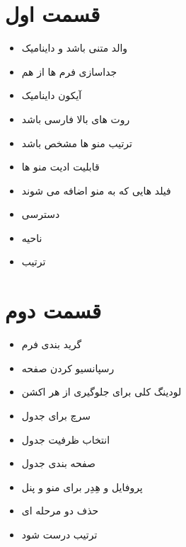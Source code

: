 \documentclass[12pt]{article}
\begin{document}


\section{قسمت اول}


\begin{itemize}
	\item والد متنی باشد و داینامیک
	\item جداسازی فرم ها از هم
	\item آیکون داینامیک
	\item روت های بالا فارسی باشد
	\item ترتیب منو ها مشخص باشد
	\item قابلیت ادیت منو ها
	\item فیلد هایی که به منو اضافه می شوند
	\item دسترسی
	\item ناحیه
	\item ترتیب
\end{itemize}



\section{قسمت دوم}


\begin{itemize}
	\item گرید بندی فرم
	\item رسپانسیو کردن صفحه
	\item لودینگ کلی برای جلوگیری از هر اکشن
	\item سرچ برای جدول
	\item انتخاب ظرفیت جدول
	\item صفحه بندی جدول
	\item پروفایل و هِدِر برای منو و پنل
	\item حذف دو مرحله ای
	\item ترتیب درست شود
\end{itemize}
\end{document}
